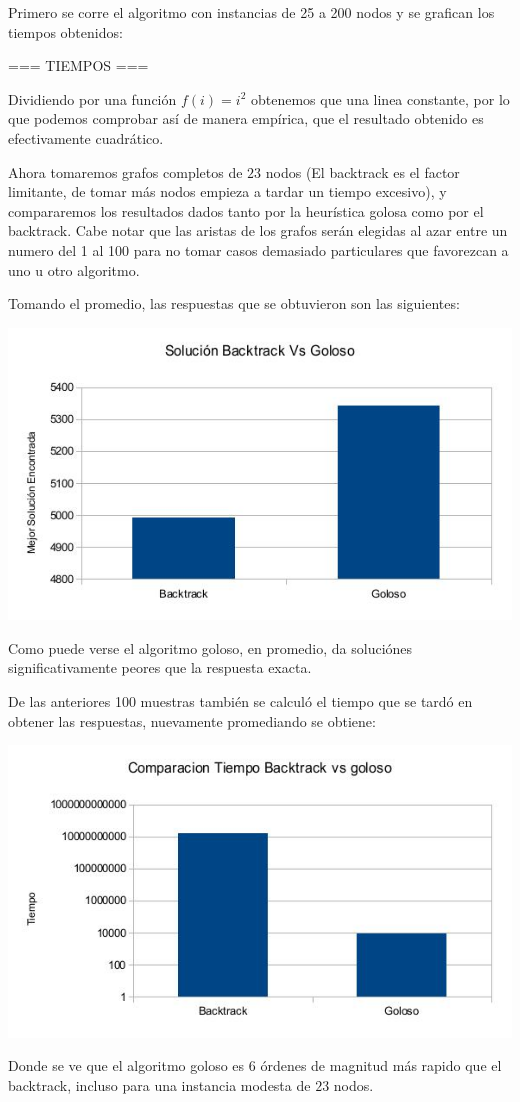 Primero se corre el algoritmo con instancias de 25 a 200 nodos y se grafican los tiempos obtenidos:


=== TIEMPOS ===

Dividiendo por una función $f(i) = i^2$ obtenemos que una linea constante, por lo que podemos comprobar así de manera empírica, que el resultado obtenido es efectivamente cuadrático.

Ahora tomaremos grafos completos de $23$ nodos (El backtrack es el factor limitante, de tomar más nodos empieza a tardar un tiempo excesivo), y compararemos los resultados dados tanto por la heurística golosa como por el backtrack. Cabe notar que las aristas de los grafos serán elegidas al azar entre un numero del 1 al 100 para no tomar casos demasiado particulares que favorezcan a uno u otro algoritmo.

Tomando el promedio, las respuestas que se obtuvieron son las siguientes:

\includegraphics[scale=0.5]{Ej3/Soluciones.jpg}

Como puede verse el algoritmo goloso, en promedio, da soluciónes significativamente peores que la respuesta exacta.

De las anteriores 100 muestras también se calculó el tiempo que se tardó en obtener las respuestas, nuevamente promediando se obtiene:

\includegraphics[scale=0.5]{Ej3/tiempos.jpg}

Donde se ve que el algoritmo goloso es $6$ órdenes de magnitud más rapido que el backtrack, incluso para una instancia modesta de $23$ nodos.